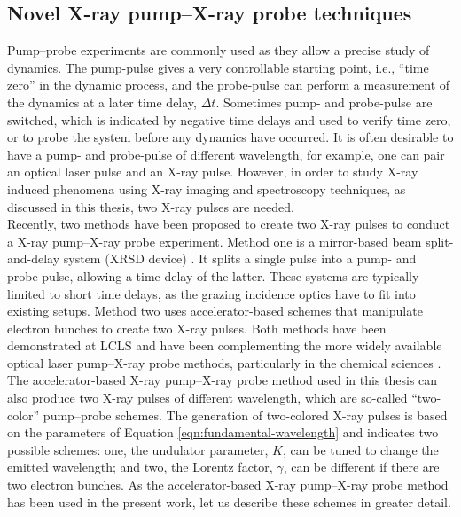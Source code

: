 \subsection{Novel X-ray pump–X-ray probe techniques}\label{sec:novel-pump--probe-tech}
Pump--probe experiments are commonly used as they allow a precise study of dynamics. The pump-pulse gives a very controllable starting point, i.e., ``time zero'' in the dynamic process, and the probe-pulse can perform a measurement of the dynamics at a later time delay, $\Delta t$. Sometimes pump- and probe-pulse are switched, which is indicated by negative time delays and used to verify time zero, or to probe the system before any dynamics have occurred.
It is often desirable to have a pump- and probe-pulse of different wavelength, for example, one can pair an optical laser pulse and an X-ray pulse.
However, in order to study X-ray induced phenomena using X-ray imaging and spectroscopy techniques, as discussed in this thesis, two X-ray pulses are needed.\\[1\baselineskip]
%
Recently, two methods have been proposed to create two X-ray pulses to conduct a X-ray pump--X-ray probe experiment. Method one is a mirror-based beam split-and-delay system (XRSD device) \citep{Castagna-2013-JPCS,Murphy-2012-SPIE,Berrah-2016-OE}. It splits a single pulse into a pump- and probe-pulse, allowing a time delay of the latter. These systems are typically limited to short time delays, as the grazing incidence optics have to fit into existing setups. Method two uses accelerator-based schemes \citep{Lutman-2013-PRL,Marinelli-2015-NatComm} that manipulate electron bunches to create two X-ray pulses.
Both methods have been demonstrated at LCLS and have been complementing the more widely available optical laser pump--X-ray probe methods, particularly in the chemical sciences \citep{Picon-2016-NatComm,Ferguson-2016-SciAdv,Liekhus-Schmaltz-2015-NatComm}.\\[1\baselineskip]
%
The accelerator-based X-ray pump--X-ray probe method used in this thesis can also produce two X-ray pulses of different wavelength, which are so-called ``two-color'' pump--probe schemes. The generation of two-colored X-ray pulses is based on the parameters of Equation \eqref{eqn:fundamental-wavelength} and indicates two possible schemes: one, the undulator parameter, $K$, can be tuned to change the emitted wavelength; and two, the Lorentz factor, $\gamma$, can be different if there are two electron bunches. As the accelerator-based X-ray pump--X-ray probe method has been used in the present work, let us describe these schemes in greater detail.
%
%
%
